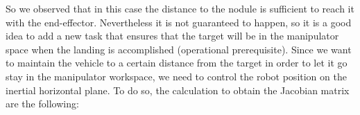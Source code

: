 \documentclass{article}
\begin{document}
\begin{figure}[H]
	\centering
	\hspace{10mm}
	\label{im:v_land_grasp}
\end{figure} 
So we observed that in this case the distance to the nodule is sufficient to reach it with the end-effector. Nevertheless it is not guaranteed to happen, so it is a good idea to add a new task that ensures that the target will be in the manipulator space when the landing is accomplished (operational prerequisite).
Since we want to maintain the vehicle to a certain distance from the target in order to let it go stay in the manipulator workspace, we need to control the robot position on the inertial horizontal plane. To do so, the calculation to obtain the Jacobian matrix are the following:
\end{document}
